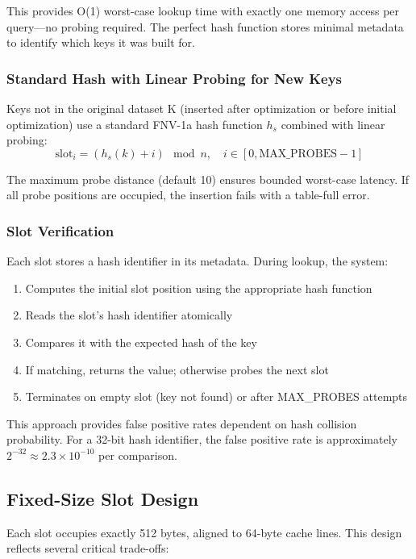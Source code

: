 \documentclass[10pt,conference]{IEEEtran}
\begin{document}
This provides O(1) worst-case lookup time with exactly one memory access per query—no probing required. The perfect hash function stores minimal metadata to identify which keys it was built for.

\subsubsection{Standard Hash with Linear Probing for New Keys}
Keys not in the original dataset K (inserted after optimization or before initial optimization) use a standard FNV-1a hash function $h_s$ combined with linear probing:
\begin{equation}
\text{slot}_i = (h_s(k) + i) \mod n, \quad i \in [0, \text{MAX\_PROBES}-1]
\end{equation}

The maximum probe distance (default 10) ensures bounded worst-case latency. If all probe positions are occupied, the insertion fails with a table-full error.

\subsubsection{Slot Verification}
Each slot stores a hash identifier in its metadata. During lookup, the system:
\begin{enumerate}
\item Computes the initial slot position using the appropriate hash function
\item Reads the slot's hash identifier atomically
\item Compares it with the expected hash of the key
\item If matching, returns the value; otherwise probes the next slot
\item Terminates on empty slot (key not found) or after MAX\_PROBES attempts
\end{enumerate}

This approach provides false positive rates dependent on hash collision probability. For a 32-bit hash identifier, the false positive rate is approximately $2^{-32} \approx 2.3 \times 10^{-10}$ per comparison.

\subsection{Fixed-Size Slot Design}

Each slot occupies exactly 512 bytes, aligned to 64-byte cache lines. This design reflects several critical trade-offs:
\end{document}

